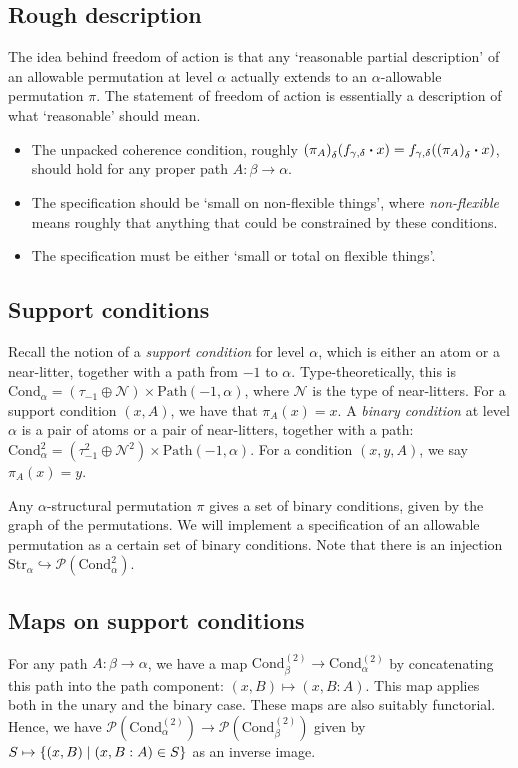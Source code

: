 \documentclass[a4paper]{article}
\begin{document}
\subsection{Rough description}
The idea behind freedom of action is that any `reasonable partial description' of an allowable permutation at level \( \alpha \) actually extends to an \( \alpha \)-allowable permutation \( \pi \).
The statement of freedom of action is essentially a description of what `reasonable' should mean.
\begin{itemize}
  \item The unpacked coherence condition, roughly \( \qty(\pi_A)_{\delta} (f_{\gamma,\delta} \vdot x) = f_{\gamma,\delta}\qty(\qty(\pi_A)_\delta \vdot x) \), should hold for any proper path \( A \colon \beta \to \alpha \).
  \item The specification should be `small on non-flexible things', where \textit{non-flexible} means roughly that anything that could be constrained by these conditions.
  \item The specification must be either `small or total on flexible things'.
\end{itemize}

\subsection{Support conditions}
Recall the notion of a \textit{support condition} for level \( \alpha \), which is either an atom or a near-litter, together with a path from \( -1 \) to \( \alpha \).
Type-theoretically, this is \( \mathrm{Cond}_\alpha = (\tau_{-1} \oplus \mathcal N) \times \mathrm{Path}(-1,\alpha) \), where \( \mathcal N \) is the type of near-litters.
For a support condition \( (x, A) \), we have that \( \pi_A(x) = x \).
A \textit{binary condition} at level \( \alpha \) is a pair of atoms or a pair of near-litters, together with a path: \( \mathrm{Cond}_\alpha^2 = (\tau_{-1}^2 \oplus \mathcal N^2) \times \mathrm{Path}(-1,\alpha) \).
For a condition \( (x,y,A) \), we say \( \pi_A(x) = y \).

Any \( \alpha \)-structural permutation \( \pi \) gives a set of binary conditions, given by the graph of the permutations.
We will implement a specification of an allowable permutation as a certain set of binary conditions.
Note that there is an injection \( \mathrm{Str}_\alpha \hookrightarrow \mathcal P(\mathrm{Cond}_\alpha^2) \).

\subsection{Maps on support conditions}
For any path \( A \colon \beta \to \alpha \), we have a map \( \mathrm{Cond}_\beta^{(2)} \to \mathrm{Cond}_\alpha^{(2)} \) by concatenating this path into the path component: \( (x,B) \mapsto (x,B:A) \). This map applies both in the unary and the binary case. These maps are also suitably functorial.
Hence, we have \( \mathcal P(\mathrm{Cond}_\alpha^{(2)}) \to \mathcal P(\mathrm{Cond}_\beta^{(2)}) \) given by \( S \mapsto \qty{(x,B) \mid (x,B:A) \in S} \) as an inverse image.
\end{document}
